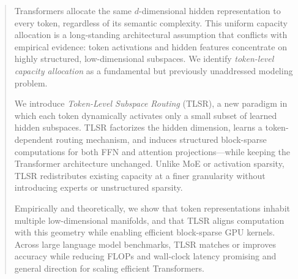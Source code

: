 \documentclass{article}
\theoremstyle{plain}
\theoremstyle{definition}
\theoremstyle{remark}
\begin{document}

\printAffiliationsAndNotice{\icmlEqualContribution}


\begin{abstract}
Transformers allocate the same $d$-dimensional hidden representation to every
token, regardless of its semantic complexity. This uniform capacity allocation
is a long-standing architectural assumption that conflicts with empirical
evidence: token activations and hidden features concentrate on highly
structured, low-dimensional subspaces. We identify \emph{token-level capacity
allocation} as a fundamental but previously unaddressed modeling problem.

We introduce \emph{Token-Level Subspace Routing} (TLSR), a new paradigm in
which each token dynamically activates only a small subset of learned hidden
subspaces. TLSR factorizes the hidden dimension, learns a token-dependent
routing mechanism, and induces structured block-sparse computations for both
FFN and attention projections—while keeping the Transformer architecture
unchanged. Unlike MoE or activation sparsity, TLSR redistributes existing
capacity at a finer granularity without introducing experts or unstructured
sparsity.

Empirically and theoretically, we show that token representations inhabit
multiple low-dimensional manifolds, and that TLSR aligns computation with this
geometry while enabling efficient block-sparse GPU kernels. Across large
language model benchmarks, TLSR matches or improves accuracy while reducing
FLOPs and wall-clock latency %
promising and general direction for scaling efficient Transformers.
\end{abstract}
\end{document}
